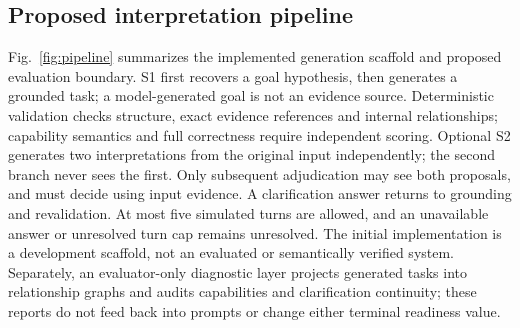 \documentclass[10pt,conference]{IEEEtran}
\begin{document}
\subsection{Proposed interpretation pipeline}
Fig.~\ref{fig:pipeline} summarizes the implemented generation scaffold and proposed evaluation boundary. S1 first recovers a goal hypothesis, then generates a grounded task; a model-generated goal is not an evidence source. Deterministic validation checks structure, exact evidence references and internal relationships; capability semantics and full correctness require independent scoring. Optional S2 generates two interpretations from the original input independently; the second branch never sees the first. Only subsequent adjudication may see both proposals, and must decide using input evidence. A clarification answer returns to grounding and revalidation. At most five simulated turns are allowed, and an unavailable answer or unresolved turn cap remains unresolved. The initial implementation is a development scaffold, not an evaluated or semantically verified system. Separately, an evaluator-only diagnostic layer projects generated tasks into relationship graphs and audits capabilities and clarification continuity; these reports do not feed back into prompts or change either terminal readiness value.
\end{document}
